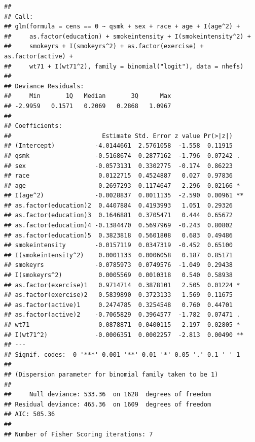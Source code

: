 \documentclass[
  10pt,
]{book}
\newenvironment{Shaded}{\begin{snugshade}}{\end{snugshade}}
\newcommand{\AttributeTok}[1]{\textcolor[rgb]{0.77,0.63,0.00}{#1}}
\newcommand{\CommentTok}[1]{\textcolor[rgb]{0.56,0.35,0.01}{\textit{#1}}}
\newcommand{\ConstantTok}[1]{\textcolor[rgb]{0.00,0.00,0.00}{#1}}
\newcommand{\DecValTok}[1]{\textcolor[rgb]{0.00,0.00,0.81}{#1}}
\newcommand{\FunctionTok}[1]{\textcolor[rgb]{0.00,0.00,0.00}{#1}}
\newcommand{\NormalTok}[1]{#1}
\newcommand{\OtherTok}[1]{\textcolor[rgb]{0.56,0.35,0.01}{#1}}
\newcommand{\SpecialCharTok}[1]{\textcolor[rgb]{0.00,0.00,0.00}{#1}}
\newcommand{\StringTok}[1]{\textcolor[rgb]{0.31,0.60,0.02}{#1}}
\begin{document}
\begin{verbatim}
## 
## Call:
## glm(formula = cens == 0 ~ qsmk + sex + race + age + I(age^2) + 
##     as.factor(education) + smokeintensity + I(smokeintensity^2) + 
##     smokeyrs + I(smokeyrs^2) + as.factor(exercise) + as.factor(active) + 
##     wt71 + I(wt71^2), family = binomial("logit"), data = nhefs)
## 
## Deviance Residuals: 
##     Min       1Q   Median       3Q      Max  
## -2.9959   0.1571   0.2069   0.2868   1.0967  
## 
## Coefficients:
##                         Estimate Std. Error z value Pr(>|z|)   
## (Intercept)           -4.0144661  2.5761058  -1.558  0.11915   
## qsmk                  -0.5168674  0.2877162  -1.796  0.07242 . 
## sex                   -0.0573131  0.3302775  -0.174  0.86223   
## race                   0.0122715  0.4524887   0.027  0.97836   
## age                    0.2697293  0.1174647   2.296  0.02166 * 
## I(age^2)              -0.0028837  0.0011135  -2.590  0.00961 **
## as.factor(education)2  0.4407884  0.4193993   1.051  0.29326   
## as.factor(education)3  0.1646881  0.3705471   0.444  0.65672   
## as.factor(education)4 -0.1384470  0.5697969  -0.243  0.80802   
## as.factor(education)5  0.3823818  0.5601808   0.683  0.49486   
## smokeintensity        -0.0157119  0.0347319  -0.452  0.65100   
## I(smokeintensity^2)    0.0001133  0.0006058   0.187  0.85171   
## smokeyrs              -0.0785973  0.0749576  -1.049  0.29438   
## I(smokeyrs^2)          0.0005569  0.0010318   0.540  0.58938   
## as.factor(exercise)1   0.9714714  0.3878101   2.505  0.01224 * 
## as.factor(exercise)2   0.5839890  0.3723133   1.569  0.11675   
## as.factor(active)1     0.2474785  0.3254548   0.760  0.44701   
## as.factor(active)2    -0.7065829  0.3964577  -1.782  0.07471 . 
## wt71                   0.0878871  0.0400115   2.197  0.02805 * 
## I(wt71^2)             -0.0006351  0.0002257  -2.813  0.00490 **
## ---
## Signif. codes:  0 '***' 0.001 '**' 0.01 '*' 0.05 '.' 0.1 ' ' 1
## 
## (Dispersion parameter for binomial family taken to be 1)
## 
##     Null deviance: 533.36  on 1628  degrees of freedom
## Residual deviance: 465.36  on 1609  degrees of freedom
## AIC: 505.36
## 
## Number of Fisher Scoring iterations: 7
\end{verbatim}

\begin{Shaded}
\end{Shaded}
\end{document}
